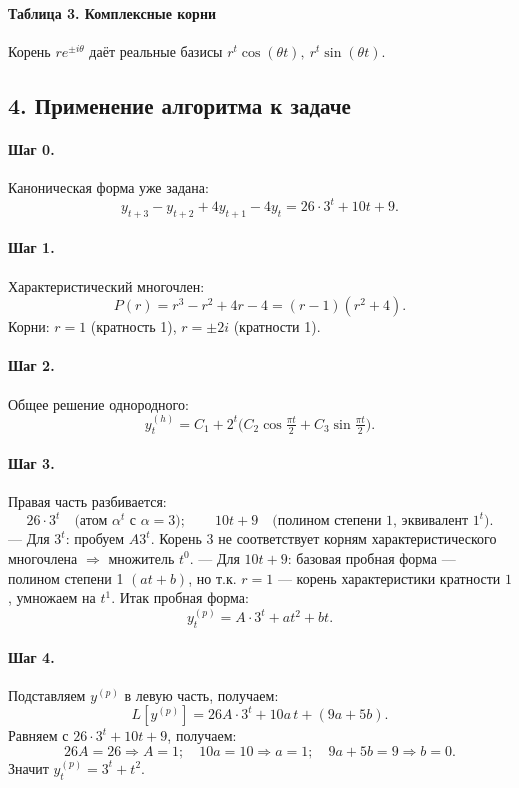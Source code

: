 \vspace{6pt}
\paragraph{Таблица 3. Комплексные корни} Корень \(re^{\pm i\theta}\) даёт реальные базисы \(r^{t}\cos(\theta t),\ r^{t}\sin(\theta t)\).

\subsection*{4. Применение алгоритма к задаче}

\paragraph{Шаг 0.} Каноническая форма уже задана:
\[
y_{t+3}-y_{t+2}+4y_{t+1}-4y_{t}=26\cdot3^{t}+10t+9.
\]

\paragraph{Шаг 1.} Характеристический многочлен:
\[
P(r)=r^{3}-r^{2}+4r-4=(r-1)(r^{2}+4).
\]
Корни: \(r=1\) (кратность 1), \(r=\pm 2i\) (кратности 1).

\paragraph{Шаг 2.} Общее решение однородного:
\[
y^{(h)}_t=C_1 + 2^{t}\bigl(C_2\cos\tfrac{\pi t}{2}+C_3\sin\tfrac{\pi t}{2}\bigr).
\]

\paragraph{Шаг 3.} Правая часть разбивается:
\[
26\cdot 3^{t}\quad\text{(атом }\alpha^{t}\text{ с }\alpha=3\text{)};\qquad 10t+9\quad\text{(полином степени 1, эквивалент }1^{t}\text{).}
\]
— Для \(3^{t}\): пробуем \(A3^{t}\). Корень \(3\) не соответствует корням характеристического многочлена \(\Rightarrow\) множитель \(t^{0}\).
— Для \(10t+9\): базовая пробная форма — полином степени 1 \((a t + b)\), но т.к. \(r=1\) — корень характеристики кратности \(1\), умножаем на \(t^{1}\). Итак пробная форма:
\[
y^{(p)}_t = A\cdot 3^{t} + a t^{2} + b t.
\]

\paragraph{Шаг 4.} Подставляем \(y^{(p)}\) в левую часть, получаем:
\[
L[y^{(p)}]=26A\cdot 3^{t} + 10a\,t + (9a+5b).
\]
Равняем с \(26\cdot 3^{t} + 10t + 9\), получаем:
\[
26A=26\Rightarrow A=1;\quad 10a=10\Rightarrow a=1;\quad 9a+5b=9\Rightarrow b=0.
\]
Значит \(y^{(p)}_t=3^{t}+t^{2}\).


